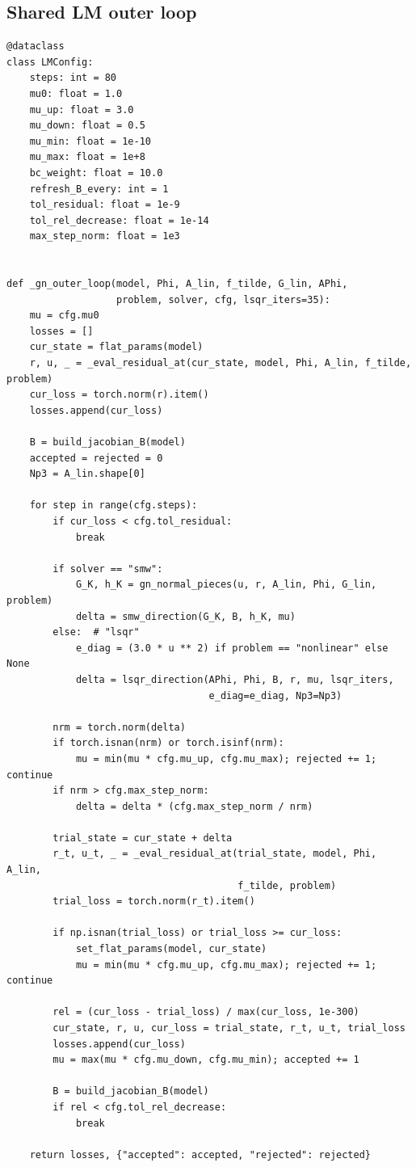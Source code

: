 \documentclass[11pt,a4paper]{article}
\begin{document}
\subsection{Shared LM outer loop}

\begin{lstlisting}[caption={Adaptive Levenberg--Marquardt with accept/reject.},label={lst:lm}]
@dataclass
class LMConfig:
    steps: int = 80
    mu0: float = 1.0
    mu_up: float = 3.0
    mu_down: float = 0.5
    mu_min: float = 1e-10
    mu_max: float = 1e+8
    bc_weight: float = 10.0
    refresh_B_every: int = 1
    tol_residual: float = 1e-9
    tol_rel_decrease: float = 1e-14
    max_step_norm: float = 1e3


def _gn_outer_loop(model, Phi, A_lin, f_tilde, G_lin, APhi,
                   problem, solver, cfg, lsqr_iters=35):
    mu = cfg.mu0
    losses = []
    cur_state = flat_params(model)
    r, u, _ = _eval_residual_at(cur_state, model, Phi, A_lin, f_tilde, problem)
    cur_loss = torch.norm(r).item()
    losses.append(cur_loss)

    B = build_jacobian_B(model)
    accepted = rejected = 0
    Np3 = A_lin.shape[0]

    for step in range(cfg.steps):
        if cur_loss < cfg.tol_residual:
            break

        if solver == "smw":
            G_K, h_K = gn_normal_pieces(u, r, A_lin, Phi, G_lin, problem)
            delta = smw_direction(G_K, B, h_K, mu)
        else:  # "lsqr"
            e_diag = (3.0 * u ** 2) if problem == "nonlinear" else None
            delta = lsqr_direction(APhi, Phi, B, r, mu, lsqr_iters,
                                   e_diag=e_diag, Np3=Np3)

        nrm = torch.norm(delta)
        if torch.isnan(nrm) or torch.isinf(nrm):
            mu = min(mu * cfg.mu_up, cfg.mu_max); rejected += 1; continue
        if nrm > cfg.max_step_norm:
            delta = delta * (cfg.max_step_norm / nrm)

        trial_state = cur_state + delta
        r_t, u_t, _ = _eval_residual_at(trial_state, model, Phi, A_lin,
                                        f_tilde, problem)
        trial_loss = torch.norm(r_t).item()

        if np.isnan(trial_loss) or trial_loss >= cur_loss:
            set_flat_params(model, cur_state)
            mu = min(mu * cfg.mu_up, cfg.mu_max); rejected += 1; continue

        rel = (cur_loss - trial_loss) / max(cur_loss, 1e-300)
        cur_state, r, u, cur_loss = trial_state, r_t, u_t, trial_loss
        losses.append(cur_loss)
        mu = max(mu * cfg.mu_down, cfg.mu_min); accepted += 1

        B = build_jacobian_B(model)
        if rel < cfg.tol_rel_decrease:
            break

    return losses, {"accepted": accepted, "rejected": rejected}
\end{lstlisting}
\end{document}
